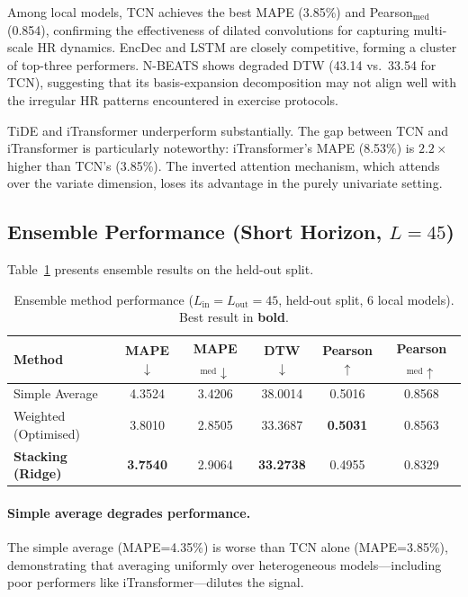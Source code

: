 \documentclass[11pt,a4paper]{article}
\begin{document}
Among local models, TCN achieves the best MAPE (3.85\%) and
Pearson$_{\mathrm{med}}$ (0.854), confirming the effectiveness of dilated
convolutions for capturing multi-scale HR dynamics.  EncDec and LSTM are
closely competitive, forming a cluster of top-three performers.  N-BEATS shows
degraded DTW (43.14 vs.\ 33.54 for TCN), suggesting that its basis-expansion
decomposition may not align well with the irregular HR patterns encountered in
exercise protocols.

TiDE and iTransformer underperform substantially.  The gap between TCN and
iTransformer is particularly noteworthy: iTransformer's MAPE (8.53\%) is
$2.2\times$ higher than TCN's (3.85\%).  The inverted attention mechanism,
which attends over the variate dimension, loses its advantage in the purely
univariate setting.

\subsection{Ensemble Performance (Short Horizon, $L=45$)}

Table~\ref{tab:ensemble_45} presents ensemble results on the held-out split.

\begin{table}[H]
  \centering
  \caption{Ensemble method performance ($L_{\mathrm{in}}=L_{\mathrm{out}}=45$,
           held-out split, 6 local models).  Best result in \textbf{bold}.}
  \label{tab:ensemble_45}
  \begin{tabular}{lccccc}
    \toprule
    Method & MAPE$\downarrow$ & MAPE$_{\mathrm{med}}\downarrow$ &
             DTW$\downarrow$ & Pearson$\uparrow$ &
             Pearson$_{\mathrm{med}}\uparrow$ \\
    \midrule
    Simple Average      & 4.3524 & 3.4206 & 38.0014 & 0.5016 & 0.8568 \\
    Weighted (Optimised)& 3.8010 & 2.8505 & 33.3687 & \textbf{0.5031} & 0.8563 \\
    \textbf{Stacking (Ridge)} & \textbf{3.7540} & 2.9064 & \textbf{33.2738}
                              & 0.4955 & 0.8329 \\
    \bottomrule
  \end{tabular}
\end{table}

\paragraph{Simple average degrades performance.}
The simple average (MAPE=4.35\%) is worse than TCN alone (MAPE=3.85\%),
demonstrating that averaging uniformly over heterogeneous models—including poor
performers like iTransformer—dilutes the signal.
\end{document}
